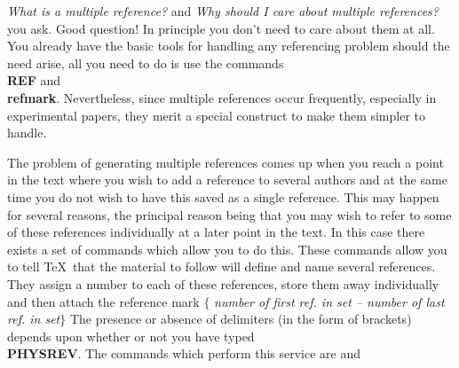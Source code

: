 {\it What is a multiple reference?} and {\it Why should I care about
multiple references?} you ask.
Good question!
In principle you don't need to care about them at all.
You already have the basic tools for handling any referencing problem
should the need arise, all you need to do is
use the commands {\bf \\REF} and {\bf \\refmark}.
Nevertheless, since multiple references occur frequently, especially
in experimental papers, they merit a special
construct to make them simpler to handle.
 
The problem of generating multiple references comes up
when you reach a point in the text where you wish to
add a reference to several authors and at the same time
you do not wish to have this saved as a single reference.
This may happen for several reasons, the principal reason
being that you may wish to refer to some of these references
individually at a later point in the text.
In this case there exists a set of commands which allow you
to do this.
These commands allow you to tell \TeX\ that the material to
follow will define and name several references.
They assign a number to each of these references,
store them away individually and then attach the reference mark \nextline
$\{$ {\it number of first ref. in set -- number of last ref. in set}$\}$
\nextline
The presence or absence of delimiters (in the form of brackets) depends
upon whether or not you have typed {\bf \\PHYSREV}.
The commands which perform this service are
and
 
